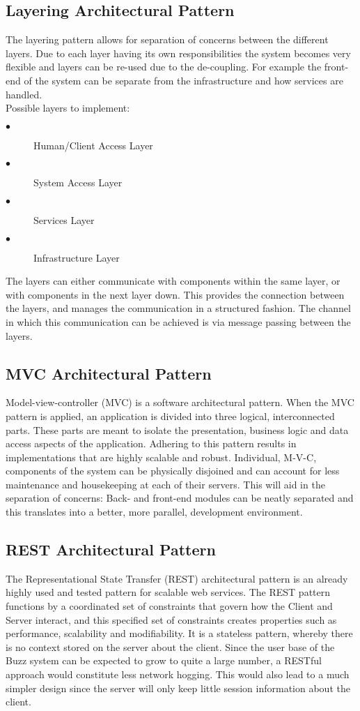 \documentclass[hidelinks, 12pt]{article}
\begin{document}
\subsection{Layering Architectural Pattern}
The layering pattern allows for separation of concerns between the different layers. Due to each layer having its own responsibilities the system becomes very flexible and layers can be re-used due to the de-coupling. For example the front-end of the system can be separate from the infrastructure and how services are handled.\\
Possible layers to implement: 
\begin{description}
\item[$\bullet$]Human/Client Access Layer
\item[$\bullet$]System Access Layer
\item[$\bullet$]Services Layer
\item[$\bullet$]Infrastructure Layer
\end{description}
The layers can either communicate with components within the same layer, or with components in the next layer down. This provides the connection between the layers, and manages the communication
in a structured fashion. The channel in which this communication can be achieved is via message passing between the layers.

\subsection{MVC Architectural Pattern}
Model-view-controller (MVC) is a software architectural pattern. When the MVC pattern is applied, an application is divided into three logical, interconnected parts. These parts are meant to isolate the presentation, business logic and data access aspects of the application. Adhering to this pattern results in implementations that are highly scalable and robust. Individual, M-V-C, components of the system can be physically disjoined and can account for less maintenance and housekeeping at each of their servers. This will aid in the separation of concerns: Back- and front-end modules can be neatly separated and this translates into a better, more parallel, development environment.

\subsection{REST Architectural Pattern}
The Representational State Transfer (REST) architectural pattern is an already highly used and tested pattern for scalable web services.
The REST pattern functions by a coordinated set of constraints that govern how the Client and Server interact, and this specified set of constraints creates properties such as performance, scalability and modifiability. 
It is a stateless pattern, whereby there is no context stored on the server about the client.
Since the user base of the Buzz system can be expected to grow to quite a large number, a RESTful approach would constitute less network hogging. This would also lead to a much simpler design since the server will only keep little session information about the client.
\end{document}

